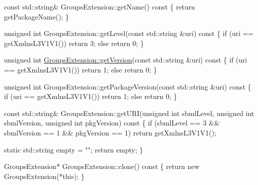 \begin{DoxyCode}
\textcolor{keyword}{const} std::string& GroupsExtension::getName()\textcolor{keyword}{ const}
\textcolor{keyword}{}\{
  \textcolor{keywordflow}{return} getPackageName();
\}

\textcolor{keywordtype}{unsigned} \textcolor{keywordtype}{int} GroupsExtension::getLevel(\textcolor{keyword}{const} std::string &uri)\textcolor{keyword}{ const}
\textcolor{keyword}{}\{
  \textcolor{keywordflow}{if} (uri == getXmlnsL3V1V1())
    \textcolor{keywordflow}{return} 3;
  \textcolor{keywordflow}{else}
    \textcolor{keywordflow}{return} 0;
\}

\textcolor{keywordtype}{unsigned} \textcolor{keywordtype}{int} \hyperlink{libstructural_8cpp_a197ace0ff709d82e38564777071f6826}{GroupsExtension::getVersion}(\textcolor{keyword}{const} std::string &uri)\textcolor{keyword}{ const}
\textcolor{keyword}{}\{
  \textcolor{keywordflow}{if} (uri == getXmlnsL3V1V1())
    \textcolor{keywordflow}{return} 1;
  \textcolor{keywordflow}{else}
    \textcolor{keywordflow}{return} 0;
\}

\textcolor{keywordtype}{unsigned} \textcolor{keywordtype}{int} GroupsExtension::getPackageVersion(\textcolor{keyword}{const} std::string &uri)\textcolor{keyword}{ const}
\textcolor{keyword}{}\{
  \textcolor{keywordflow}{if} (uri == getXmlnsL3V1V1())
    \textcolor{keywordflow}{return} 1;
  \textcolor{keywordflow}{else}
    \textcolor{keywordflow}{return} 0;
\}

\textcolor{keyword}{const} std::string& GroupsExtension::getURI(\textcolor{keywordtype}{unsigned} \textcolor{keywordtype}{int} sbmlLevel,
                                           \textcolor{keywordtype}{unsigned} \textcolor{keywordtype}{int} sbmlVersion,
                                           \textcolor{keywordtype}{unsigned} \textcolor{keywordtype}{int} pkgVersion)\textcolor{keyword}{ const}
\textcolor{keyword}{}\{
  \textcolor{keywordflow}{if} (sbmlLevel == 3 && sbmlVersion == 1 && pkgVersion == 1)
    \textcolor{keywordflow}{return} getXmlnsL3V1V1();

  \textcolor{keyword}{static} std::string empty = \textcolor{stringliteral}{""};
  \textcolor{keywordflow}{return} empty;
\}

GroupsExtension* GroupsExtension::clone()\textcolor{keyword}{ const}
\textcolor{keyword}{}\{
  \textcolor{keywordflow}{return} \textcolor{keyword}{new} GroupsExtension(*\textcolor{keyword}{this});
\}
\end{DoxyCode}


